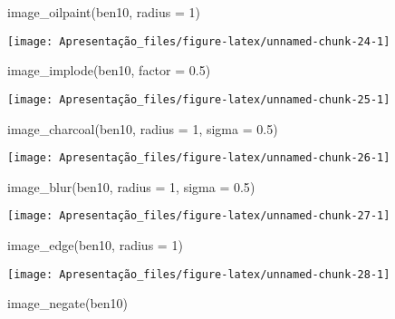 \documentclass[
]{article}
\newenvironment{Shaded}{\begin{snugshade}}{\end{snugshade}}
\newcommand{\AttributeTok}[1]{\textcolor[rgb]{0.77,0.63,0.00}{#1}}
\newcommand{\DecValTok}[1]{\textcolor[rgb]{0.00,0.00,0.81}{#1}}
\newcommand{\FloatTok}[1]{\textcolor[rgb]{0.00,0.00,0.81}{#1}}
\newcommand{\FunctionTok}[1]{\textcolor[rgb]{0.00,0.00,0.00}{#1}}
\newcommand{\NormalTok}[1]{#1}
\begin{document}
\begin{Shaded}
\begin{Highlighting}[]
\FunctionTok{image\_oilpaint}\NormalTok{(ben10, }\AttributeTok{radius =} \DecValTok{1}\NormalTok{)}
\end{Highlighting}
\end{Shaded}

\texttt{[image: Apresentação\_files/figure-latex/unnamed-chunk-24-1]}

\begin{Shaded}
\begin{Highlighting}[]
\FunctionTok{image\_implode}\NormalTok{(ben10, }\AttributeTok{factor =} \FloatTok{0.5}\NormalTok{)}
\end{Highlighting}
\end{Shaded}

\texttt{[image: Apresentação\_files/figure-latex/unnamed-chunk-25-1]}

\begin{Shaded}
\begin{Highlighting}[]
\FunctionTok{image\_charcoal}\NormalTok{(ben10, }\AttributeTok{radius =} \DecValTok{1}\NormalTok{, }\AttributeTok{sigma =} \FloatTok{0.5}\NormalTok{)}
\end{Highlighting}
\end{Shaded}

\texttt{[image: Apresentação\_files/figure-latex/unnamed-chunk-26-1]}

\begin{Shaded}
\begin{Highlighting}[]
\FunctionTok{image\_blur}\NormalTok{(ben10, }\AttributeTok{radius =} \DecValTok{1}\NormalTok{, }\AttributeTok{sigma =} \FloatTok{0.5}\NormalTok{)}
\end{Highlighting}
\end{Shaded}

\texttt{[image: Apresentação\_files/figure-latex/unnamed-chunk-27-1]}

\begin{Shaded}
\begin{Highlighting}[]
\FunctionTok{image\_edge}\NormalTok{(ben10, }\AttributeTok{radius =} \DecValTok{1}\NormalTok{)}
\end{Highlighting}
\end{Shaded}

\texttt{[image: Apresentação\_files/figure-latex/unnamed-chunk-28-1]}

\begin{Shaded}
\begin{Highlighting}[]
\FunctionTok{image\_negate}\NormalTok{(ben10)}
\end{Highlighting}
\end{Shaded}
\end{document}
